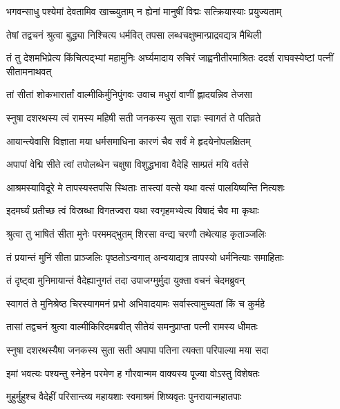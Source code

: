 \twolineshloka
{भगवन्साधु पश्येमां देवतामिव खाच्च्युताम्}
{न ह्येनां मानुषीं विद्मः सत्क्रियास्याः प्रयुज्यताम्} %

\twolineshloka
{तेषां तद्वचनं श्रुत्वा बुद्ध्या निश्चित्य धर्मवित्}
{तपसा लब्धचक्षुष्मान्प्राद्रवद्यत्र मैथिली} %

\threelineshloka
{तं तु देशमभिप्रेत्य किंचित्पद्भ्यां महामुनिः}
{अर्घ्यमादाय रुचिरं जाह्वनीतीरमाश्रितः}
{ददर्श राघवस्येष्टां पत्नीं सीतामनाथवत्} %

\twolineshloka
{तां सीतां शोकभारार्तां वाल्मीकिर्मुनिपुंगवः}
{उवाच मधुरां वाणीं ह्लादयन्निव तेजसा} %

\twolineshloka
{स्नुषा दशरथस्य त्वं रामस्य महिषी सती}
{जनकस्य सुता राज्ञः स्वागतं ते पतिव्रते} %

\twolineshloka
{आयान्त्येवासि विज्ञाता मया धर्मसमाधिना}
{कारणं चैव सर्वं मे हृदयेनोपलक्षितम्} %

\twolineshloka
{अपापां वेद्मि सीते त्वां तपोलब्धेन चक्षुषा}
{विशुद्धभावा वैदेहि साम्प्रतं मयि वर्तसे} %

\twolineshloka
{आश्रमस्याविदूरे मे तापस्यस्तपसि स्थिताः}
{तास्त्वां वत्से यथा वत्सं पालयिष्यन्ति नित्यशः} %

\twolineshloka
{इदमर्घ्यं प्रतीच्छ त्वं विस्रब्धा विगतज्वरा}
{यथा स्वगृहमभ्येत्य विषादं चैव मा कृथाः} %

\twolineshloka
{श्रुत्वा तु भाषितं सीता मुनेः परममद्भुतम्}
{शिरसा वन्द्य चरणौ तथेत्याह कृताञ्जलिः} %

\twolineshloka
{तं प्रयान्तं मुनिं सीता प्राञ्जलिः पृष्ठतोऽन्वगात्}
{अन्वयाद्यत्र तापस्यो धर्मनित्याः समाहिताः} %

\twolineshloka
{तं दृष्ट्वा मुनिमायान्तं वैदेह्यानुगतं तदा}
{उपाजग्मुर्मुदा युक्ता वचनं चेदमब्रुवन्} %

\twolineshloka
{स्वागतं ते मुनिश्रेष्ठ चिरस्यागमनं प्रभो}
{अभिवादयामः सर्वास्त्वामुच्यतां किं च कुर्महे} %

\twolineshloka
{तासां तद्वचनं श्रुत्वा वाल्मीकिरिदमब्रवीत्}
{सीतेयं समनुप्राप्ता पत्नी रामस्य धीमतः} %

\twolineshloka
{स्नुषा दशरथस्यैषा जनकस्य सुता सती}
{अपापा पतिना त्यक्ता परिपाल्या मया सदा} %

\twolineshloka
{इमां भवत्यः पश्यन्तु स्नेहेन परमेण ह}
{गौरवान्मम वाक्यस्य पूज्या वोऽस्तु विशेषतः} %

\twolineshloka
{मुहुर्मुहुश्च वैदेहीं परिसान्त्व्य महायशाः}
{स्वमाश्रमं शिष्यवृतः पुनरायान्महातपाः} %


